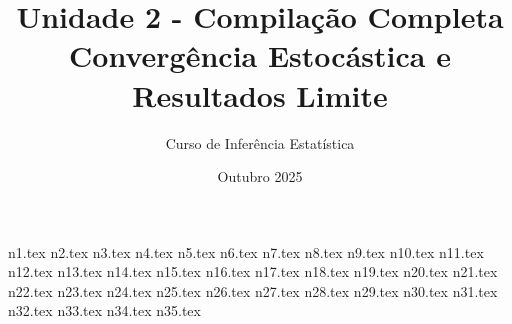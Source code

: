 \documentclass[12pt,a4paper]{article}
\title{Unidade 2 - Compilação Completa\\
\large Convergência Estocástica e Resultados Limite}
\author{Curso de Inferência Estatística}
\date{Outubro 2025}
\begin{document}
\maketitle
\tableofcontents
\newpage

{n1.tex}
{n2.tex}
{n3.tex}
{n4.tex}
{n5.tex}
{n6.tex}
{n7.tex}
{n8.tex}
{n9.tex}
{n10.tex}
{n11.tex}
{n12.tex}
{n13.tex}
{n14.tex}
{n15.tex}
{n16.tex}
{n17.tex}
{n18.tex}
{n19.tex}
{n20.tex}
{n21.tex}
{n22.tex}
{n23.tex}
{n24.tex}
{n25.tex}
{n26.tex}
{n27.tex}
{n28.tex}
{n29.tex}
{n30.tex}
{n31.tex}
{n32.tex}
{n33.tex}
{n34.tex}
{n35.tex}
\end{document}
